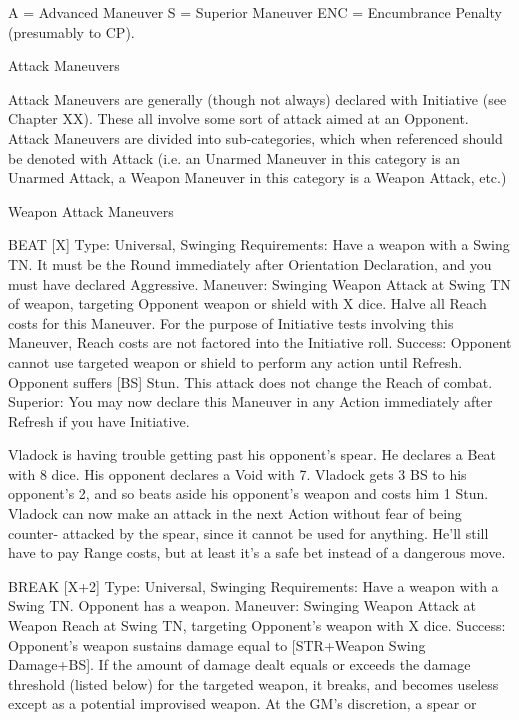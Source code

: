\documentclass[oneside,11pt,english]{book}
\begin{document}
A = Advanced Maneuver 
S = Superior Maneuver 
ENC = Encumbrance Penalty (presumably to CP). 
 

 

Attack Maneuvers 

 

Attack Maneuvers are generally (though not always) declared with Initiative (see Chapter XX). These all 
involve some sort of attack aimed at an Opponent. Attack Maneuvers are divided into sub-categories, 
which when referenced should be denoted with Attack (i.e. an Unarmed Maneuver in this category is an 
Unarmed Attack, a Weapon Maneuver in this category is a Weapon Attack, etc.) 

 

 

 

 

 

Weapon Attack Maneuvers 

 

BEAT [X] 
Type: Universal, Swinging 
Requirements: Have a weapon with a Swing TN. It must be the Round immediately after Orientation 
Declaration, and you must have declared Aggressive. 
Maneuver: Swinging Weapon Attack at Swing TN of weapon, targeting Opponent weapon or shield with 
X dice. Halve all Reach costs for this Maneuver. For the purpose of Initiative tests involving this 
Maneuver, Reach costs are not factored into the Initiative roll. 
Success: Opponent cannot use targeted weapon or shield to perform any action until Refresh. Opponent 
suffers [BS] Stun. This attack does not change the Reach of combat. 
Superior: You may now declare this Maneuver in any Action immediately after Refresh if you have 
Initiative. 

 

Vladock is having trouble getting past his opponent’s spear. He declares a Beat with 8 dice. His opponent 
declares a Void with 7. Vladock gets 3 BS to his opponent’s 2, and so beats aside his opponent’s weapon 
and costs him 1 Stun. Vladock can now make an attack in the next Action without fear of being counter-
attacked by the spear, since it cannot be used for anything. He’ll still have to pay Range costs, but at least 
it’s a safe bet instead of a dangerous move. 

 

BREAK [X+2] 
Type: Universal, Swinging 
Requirements: Have a weapon with a Swing TN. Opponent has a weapon. 
Maneuver: Swinging Weapon Attack at Weapon Reach at Swing TN, targeting Opponent’s weapon with 
X dice. 
Success: Opponent’s weapon sustains damage equal to [STR+Weapon Swing Damage+BS]. If the 
amount of damage dealt equals or exceeds the damage threshold (listed below) for the targeted weapon, it 
breaks, and becomes useless except as a potential improvised weapon. At the GM’s discretion, a spear or 
\end{document}
